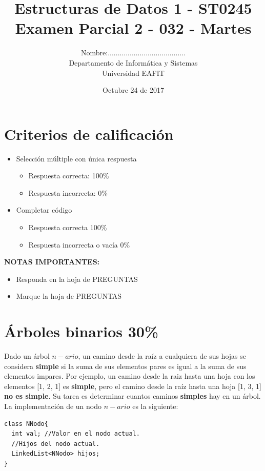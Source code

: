 \documentclass[twocolumn]{article}
\author{
Nombre:....................................... \\
    Departamento de Informática y Sistemas \\
    Universidad EAFIT \\
}
\title{
    Estructuras de Datos 1 - ST0245 \\
    Examen Parcial 2 - 032 - Martes
}
\date{
    Octubre 24 de 2017
}
\begin{document}
\vspace{-5cm}
\maketitle


\section*{Criterios de calificación}


\begin{itemize}
\item Selección múltiple con única respuesta
\begin{itemize}
\item Respuesta correcta: 100\%
\item Respuesta incorrecta: 0\%
\end{itemize}

\item Completar código
\begin{itemize}
\item Respuesta correcta 100\%
\item Respuesta incorrecta o vacía 0\%\\
\end{itemize}
\end{itemize}


\textbf{NOTAS IMPORTANTES:}
\begin{itemize}
	\item Responda en la hoja de PREGUNTAS
	\item Marque la hoja de PREGUNTAS
\end{itemize}


\section{Árboles binarios 30\%}
Dado un árbol $n -ario$, un camino desde la raíz a cualquiera de sus hojas se considera \textbf{simple} si la suma de sus elementos pares es igual a la suma de sus elementos impares. Por ejemplo, un camino desde la raiz hasta una hoja con los elementos [1, 2, 1] es \textbf{simple}, pero el camino desde la raíz hasta una hoja [1, 3, 1] \textbf{no es simple}. Su tarea es determinar cuantos caminos \textbf{simples} hay en un árbol. La implementación de un nodo $n-ario$ es la siguiente:

\begin{verbatim}
class NNodo{
  int val; //Valor en el nodo actual.
  //Hijos del nodo actual.
  LinkedList<NNodo> hijos; 
}
\end{verbatim}
\end{document}
